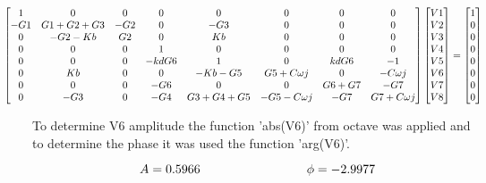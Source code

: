 \begin{gather}
    \hspace{-10mm}
    \begin{bmatrix}
    1       &   0       & 0     &   0 & 0 & 0 & 0 & 0\\
    -G1      &   G1+G2+G3       & -G2     &   0 & -G3 & 0 & 0 & 0  \\
    0       &   -G2-Kb       & G2     &   0 & Kb &0&0 & 0  \\   
    0       &   0       & 0     &   1 & 0 & 0 & 0 & 0 \\
    0 & 0 & 0 & -kdG6 & 1 & 0 & kdG6 & -1 \\
    0       &   Kb       & 0     & 0 &   -Kb-G5 & G5+C\omega j & 0 & -C\omega j  \\
    0       &   0       & 0     &   -G6 & 0 & 0 & G6+G7 & -G7  \\
    0 & -G3 & 0 & -G4 & G3+G4+G5 & -G5-C\omega j & -G7 &  G7+C\omega j \\
    \end{bmatrix}
    \begin{bmatrix}
    V1     \\
    V2     \\
    V3     \\
    V4     \\
    V5     \\
    V6     \\
    V7     \\
    V8     \\
    \end{bmatrix}
    =
    \begin{bmatrix}
    1     \\
    0      \\
    0      \\
    0     \\
    0     \\
    0     \\
    0      \\
    0   \\
    \end{bmatrix}
\end{gather}

To determine V6 amplitude the function 'abs(V6)' from octave was applied and to determine the phase it was used the function 'arg(V6)'.

\begin{equation}
A = 0.5966
\hspace{30mm}
\phi = -2.9977
\end{equation}


